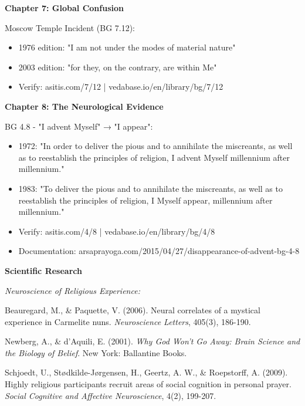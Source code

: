 \documentclass[12pt,twoside]{book}
\begin{document}
\vspace{0.5cm}

\textbf{\textbf{Chapter 7: Global Confusion}}

Moscow Temple Incident (BG 7.12):
\begin{itemize}
\item 1976 edition: "I am not under the modes of material nature"
\item 2003 edition: "for they, on the contrary, are within Me"
\item Verify: asitis.com/7/12 | vedabase.io/en/library/bg/7/12
\end{itemize}

\vspace{0.5cm}

\textbf{\textbf{Chapter 8: The Neurological Evidence}}

BG 4.8 - "I advent Myself" → "I appear":
\begin{itemize}
\item 1972: "In order to deliver the pious and to annihilate the miscreants, as well as to reestablish the principles of religion, I advent Myself millennium after millennium."
\item 1983: "To deliver the pious and to annihilate the miscreants, as well as to reestablish the principles of religion, I Myself appear, millennium after millennium."
\item Verify: asitis.com/4/8 | vedabase.io/en/library/bg/4/8
\item Documentation: arsaprayoga.com/2015/04/27/disappearance-of-advent-bg-4-8
\end{itemize}

\vspace{0.5cm}

\textbf{\textbf{Scientific Research}}

\emph{Neuroscience of Religious Experience:}

Beauregard, M., \& Paquette, V. (2006). Neural correlates of a mystical experience in Carmelite nuns. \emph{Neuroscience Letters}, 405(3), 186-190.

Newberg, A., \& d'Aquili, E. (2001). \emph{Why God Won't Go Away: Brain Science and the Biology of Belief}. New York: Ballantine Books.

Schjoedt, U., Stødkilde-Jørgensen, H., Geertz, A. W., \& Roepstorff, A. (2009). Highly religious participants recruit areas of social cognition in personal prayer. \emph{Social Cognitive and Affective Neuroscience}, 4(2), 199-207.
\end{document}
